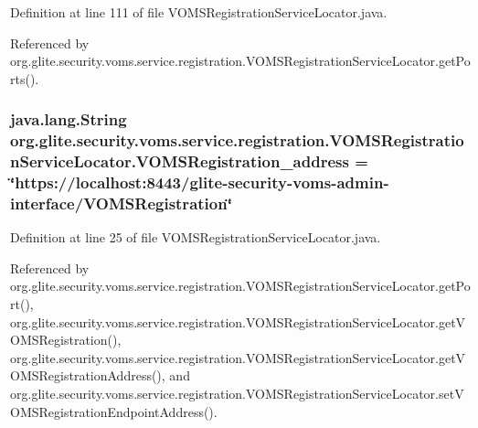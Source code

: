Definition at line 111 of file VOMSRegistrationServiceLocator.java.



Referenced by org.glite.security.voms.service.registration.VOMSRegistrationServiceLocator.getPorts().

\hypertarget{classorg_1_1glite_1_1security_1_1voms_1_1service_1_1registration_1_1VOMSRegistrationServiceLocator_a8b1d238baa33c02d1366768aac9fb7bc}{
\subsubsection[{VOMSRegistration\_\-address}]{\setlength{\rightskip}{0pt plus 5cm}java.lang.String {\bf org.glite.security.voms.service.registration.VOMSRegistrationServiceLocator.VOMSRegistration\_\-address} = \char`\"{}https://localhost:8443/glite-\/security-\/voms-\/admin-\/interface/{\bf VOMSRegistration}\char`\"{}}}
\label{classorg_1_1glite_1_1security_1_1voms_1_1service_1_1registration_1_1VOMSRegistrationServiceLocator_a8b1d238baa33c02d1366768aac9fb7bc}


Definition at line 25 of file VOMSRegistrationServiceLocator.java.



Referenced by org.glite.security.voms.service.registration.VOMSRegistrationServiceLocator.getPort(), org.glite.security.voms.service.registration.VOMSRegistrationServiceLocator.getVOMSRegistration(), org.glite.security.voms.service.registration.VOMSRegistrationServiceLocator.getVOMSRegistrationAddress(), and org.glite.security.voms.service.registration.VOMSRegistrationServiceLocator.setVOMSRegistrationEndpointAddress().

